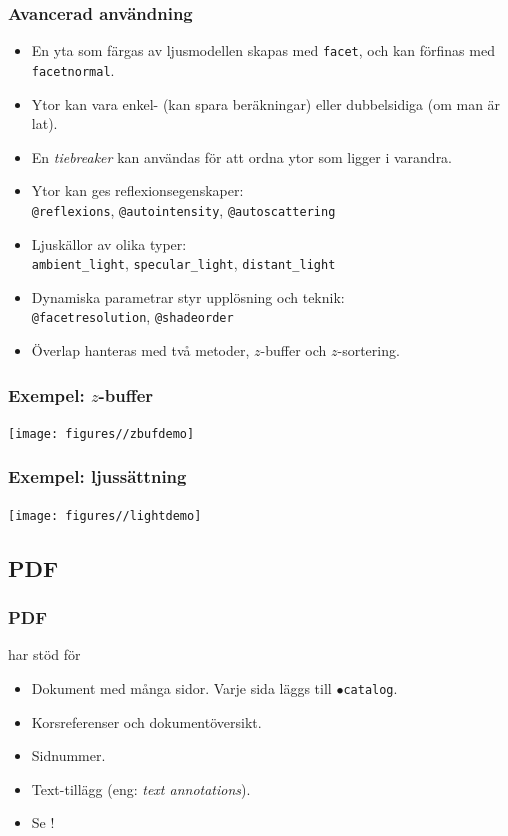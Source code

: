 \documentclass[noamsthm,handout]{beamer}
\newcommand{\inEnglish}[1]{(eng: \emph{#1})}
\begin{document}
\begin{frame}\frametitle{Avancerad användning}
  \begin{itemize}
  \item En yta som färgas av ljusmodellen skapas med \texttt{facet}, och kan förfinas med \texttt{facetnormal}.
  \item Ytor kan vara enkel- (kan spara beräkningar) eller dubbelsidiga (om man är lat).
  \item En \emph{tiebreaker} kan användas för att ordna ytor som ligger i varandra.
  \item Ytor kan ges reflexionsegenskaper:\\
    \texttt{@reflexions}, \texttt{@autointensity}, \texttt{@autoscattering}
  \item Ljuskällor av olika typer:\\
    \texttt{ambient\_light}, \texttt{specular\_light}, \texttt{distant\_light}
  \item Dynamiska parametrar styr upplösning och teknik:\\
    \texttt{@facetresolution}, \texttt{@shadeorder}
  \item Överlap hanteras med två metoder, $z$-buffer och $z$-sortering.
  \end{itemize}
\end{frame}
\begin{frame}\frametitle{Exempel: $z$-buffer}
  \begin{center}
    \texttt{[image: figures//zbufdemo]}
  \end{center}
\end{frame}
{
\begin{frame}\frametitle{Exempel: ljussättning}
  \begin{center}
    \texttt{[image: figures//lightdemo]}
  \end{center}
\end{frame}
}
\subsection{PDF}
\begin{frame}\frametitle{PDF}
  \Shapes har stöd för
  \begin{itemize}
  \item Dokument med många sidor.  Varje sida läggs till \texttt{$\bullet$catalog}.
  \item Korsreferenser och dokumentöversikt.
  \item Sidnummer.
  \item Text-tillägg \inEnglish{text annotations}.
  \item Se !
  \end{itemize}
\end{frame}
\end{document}

